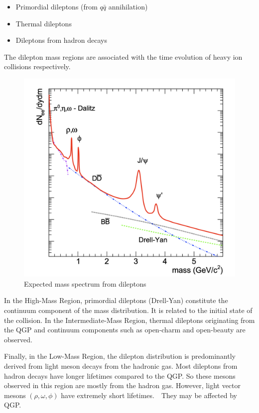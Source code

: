         \begin{itemize}
            \item Primordial dileptons (from \(q\bar{q}\) annihilation)
            \item Thermal dileptons
            \item Dileptons from hadron decays
        \end{itemize} 
        The dilepton mass regions are associated with the time evolution of heavy ion collisions respectively.
        \begin{figure}[hbtp]
            \centering
            \includegraphics[keepaspectratio, scale=0.3]{fig/1_6_expected_dileptonMass.png}
            \caption{Expected mass spectrum from dileptons\cite{Rapp:1999ej}}
            \label{Intro:Dilepton:dilepton_mass}
        \end{figure}
        
        In the High-Mass Region, primordial dileptons (Drell-Yan) constitute the continuum component of the mass distribution. It is related to the initial state of the collision. In the Intermediate-Mass Region, thermal dileptons originating from the QGP and continuum components such as open-charm and open-beauty are observed. 
        
        Finally, in the Low-Mass Region, the dilepton distribution is predominantly derived from light meson decays from the hadronic gas. Most dileptons from hadron decays have longer lifetimes compared to the QGP. So these mesons observed in this region are mostly from the hadron gas. However, light vector mesons $(\rho, \omega, \phi)$ have extremely short lifetimes.　They may be affected by QGP.
